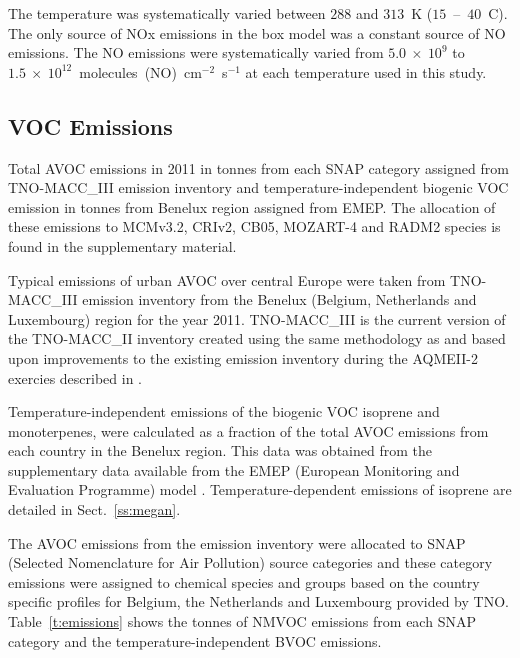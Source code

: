 The temperature was systematically varied between $288$ and $313$~K ($15$~--~$40$~\degree C). 
The only source of NOx emissions in the box model was a constant source of NO emissions. 
The NO emissions were systematically varied from $5.0~\times~10^9$ to $1.5~\times~10^{12}$~molecules~(NO)~cm$^{-2}$~s$^{-1}$ at each temperature used in this study. 

\subsection{VOC Emissions} \label{ss:VOC_emissions}
{%
    \renewcommand{\arraystretch}{1.1}%
    \begin{table}%
        \centering%
        \caption{Total AVOC emissions in 2011 in tonnes from each SNAP category assigned from TNO-MACC\_III emission inventory and temperature-independent biogenic VOC emission in tonnes from Benelux region assigned from EMEP. The allocation of these emissions to MCMv3.2, CRIv2, CB05, MOZART-4 and RADM2 species is found in the supplementary material.}%
        
        \label{t:emissions}
    \end{table}%
}
Typical emissions of urban AVOC over central Europe were taken from TNO-MACC\_III emission inventory from the Benelux (Belgium, Netherlands and Luxembourg) region for the year 2011.
TNO-MACC\_III is the current version of the TNO-MACC\_II inventory created using the same methodology as \citet{Kuenen:2014} and based upon improvements to the existing emission inventory during the AQMEII-2 exercies described in \citet{Pouliot:2015}. 

Temperature-independent emissions of the biogenic VOC isoprene and monoterpenes, were calculated as a fraction of the total AVOC emissions from each country in the Benelux region.
This data was obtained from the supplementary data available from the EMEP (European Monitoring and Evaluation Programme) model \citep{Simpson:2012}.
Temperature-dependent emissions of isoprene are detailed in Sect.~\ref{ss:megan}.

The AVOC emissions from the emission inventory were allocated to SNAP (Selected Nomenclature for Air Pollution) source categories and these category emissions were assigned to chemical species and groups based on the country specific profiles for Belgium, the Netherlands and Luxembourg provided by TNO.
Table~\ref{t:emissions} shows the tonnes of NMVOC emissions from each SNAP category and the temperature-independent BVOC emissions.

